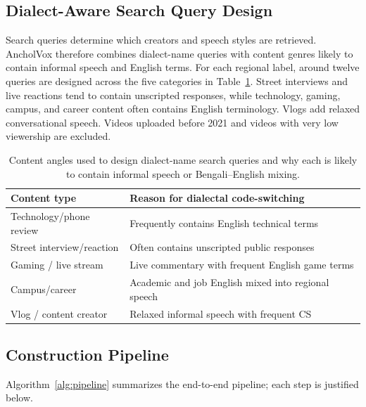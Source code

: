 \documentclass[journal]{IEEEtran}
\begin{document}
\subsection{Dialect-Aware Search Query Design}

Search queries determine which creators and speech styles are retrieved.
AncholVox therefore combines dialect-name queries with content genres likely to
contain informal speech and English terms. For each regional label, around
twelve queries are designed across the five categories in
Table~\ref{tab:queries}. Street interviews and live reactions tend to contain
unscripted responses, while technology, gaming, campus, and career content
often contains English terminology. Vlogs add relaxed conversational speech.
Videos uploaded before 2021 and videos with very low viewership are excluded.


\begin{table}[t]
\caption{Content angles used to design dialect-name search queries and why each
is likely to contain informal speech or Bengali--English mixing.}
\label{tab:queries}
\centering\small
\begin{tabular}{p{2.4cm}p{5.0cm}}
\toprule
\textbf{Content type} & \textbf{Reason for dialectal code-switching} \\
\midrule
Technology/phone review & Frequently contains English technical terms \\
Street interview/reaction & Often contains unscripted public responses \\
Gaming / live stream & Live commentary with frequent English game terms \\
Campus/career & Academic and job English mixed into regional speech \\
Vlog / content creator & Relaxed informal speech with frequent CS \\
\bottomrule
\end{tabular}
\end{table}

\subsection{Construction Pipeline}
Algorithm~\ref{alg:pipeline} summarizes the end-to-end pipeline; each step is
justified below.
\end{document}
